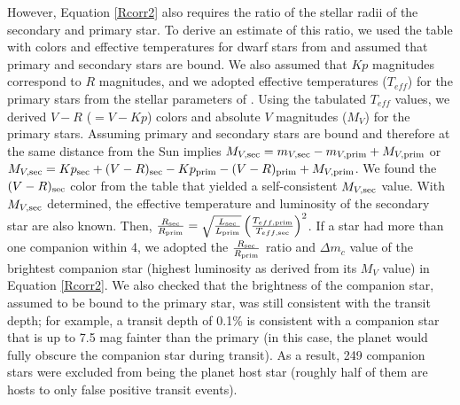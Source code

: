 \documentclass[twocolumn,appendixfloats]{aastex6}
\begin{document}
However, Equation \ref{Rcorr2} also requires the ratio of the stellar radii
of the secondary and primary star. To derive an estimate of this ratio, we 
used the table with colors and effective temperatures for dwarf stars from 
\citet{pecaut13} and assumed that primary and secondary stars are bound. 
We also assumed that $Kp$ magnitudes correspond to $R$ magnitudes, 
and we adopted effective temperatures ($T_{eff}$) for the primary stars from 
the stellar parameters of \citet{huber14}. Using the tabulated $T_{eff}$ 
values, we derived $V-R$ ($=V-Kp$) colors and absolute $V$ magnitudes 
($M_{V}$) for the primary stars. Assuming primary and secondary stars are 
bound and therefore at the same distance from the Sun implies 
$M_{V, \rm sec} = m_{V, \rm sec}-m_{V, \rm prim}+ M_{V, \rm prim}$ or 
$M_{V, \rm sec} = Kp_{\rm sec}+(V-R)_{\rm sec}-Kp_{\rm prim}-
(V-R)_{\rm prim}+M_{V, \rm prim}$.
We found the $(V-R)_{\rm sec}$ color from the \citet{pecaut13} table 
that yielded a self-consistent $M_{V, \rm sec}$ value. With $M_{V, \rm sec}$
determined, the effective temperature and luminosity of the secondary
star are also known. Then, $\frac{R_{\rm sec}}{R_{\rm prim}} =
\sqrt{\frac{L_{\rm sec}}{L_{\rm prim}}}\left(\frac{T_{eff, \rm prim}}
{T_{eff, \rm sec}}\right)^2$. If a star had more than one companion
within 4\arcsec, we adopted the $\frac{R_{\rm sec}}{R_{\rm prim}}$
ratio and $\Delta m_c$ value of the brightest companion star (highest
luminosity as derived from its $M_V$ value) in Equation \ref{Rcorr2}.
We also checked that the brightness of the companion star, assumed to
be bound to the primary star, was still consistent with the transit depth; for 
example, a transit depth of 0.1\% is consistent with a companion star that 
is up to 7.5 mag fainter than the primary (in this case, the planet would fully 
obscure the companion star during transit). As a result, 249 companion 
stars were excluded from being the planet host star (roughly half of them are 
hosts to only false positive transit events).
\end{document}
